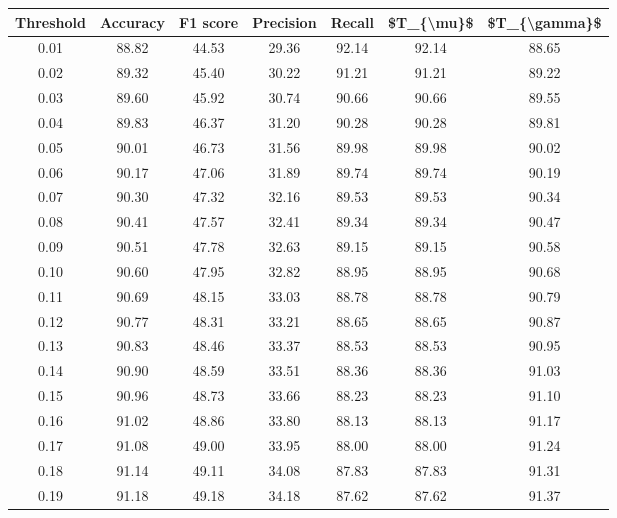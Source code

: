 \begin{tabular}{|c|c|c|c|c|c|c|}
\hline
 Threshold &  Accuracy &  F1 score &  Precision &  Recall &  \$T\_\{\textbackslash mu\}\$ &  \$T\_\{\textbackslash gamma\}\$ \\
\hline
      0.01 &     88.82 &     44.53 &      29.36 &   92.14 &      92.14 &         88.65 \\
      0.02 &     89.32 &     45.40 &      30.22 &   91.21 &      91.21 &         89.22 \\
      0.03 &     89.60 &     45.92 &      30.74 &   90.66 &      90.66 &         89.55 \\
      0.04 &     89.83 &     46.37 &      31.20 &   90.28 &      90.28 &         89.81 \\
      0.05 &     90.01 &     46.73 &      31.56 &   89.98 &      89.98 &         90.02 \\
      0.06 &     90.17 &     47.06 &      31.89 &   89.74 &      89.74 &         90.19 \\
      0.07 &     90.30 &     47.32 &      32.16 &   89.53 &      89.53 &         90.34 \\
      0.08 &     90.41 &     47.57 &      32.41 &   89.34 &      89.34 &         90.47 \\
      0.09 &     90.51 &     47.78 &      32.63 &   89.15 &      89.15 &         90.58 \\
      0.10 &     90.60 &     47.95 &      32.82 &   88.95 &      88.95 &         90.68 \\
      0.11 &     90.69 &     48.15 &      33.03 &   88.78 &      88.78 &         90.79 \\
      0.12 &     90.77 &     48.31 &      33.21 &   88.65 &      88.65 &         90.87 \\
      0.13 &     90.83 &     48.46 &      33.37 &   88.53 &      88.53 &         90.95 \\
      0.14 &     90.90 &     48.59 &      33.51 &   88.36 &      88.36 &         91.03 \\
      0.15 &     90.96 &     48.73 &      33.66 &   88.23 &      88.23 &         91.10 \\
      0.16 &     91.02 &     48.86 &      33.80 &   88.13 &      88.13 &         91.17 \\
      0.17 &     91.08 &     49.00 &      33.95 &   88.00 &      88.00 &         91.24 \\
      0.18 &     91.14 &     49.11 &      34.08 &   87.83 &      87.83 &         91.31 \\
      0.19 &     91.18 &     49.18 &      34.18 &   87.62 &      87.62 &         91.37 \\

\end{tabular}
